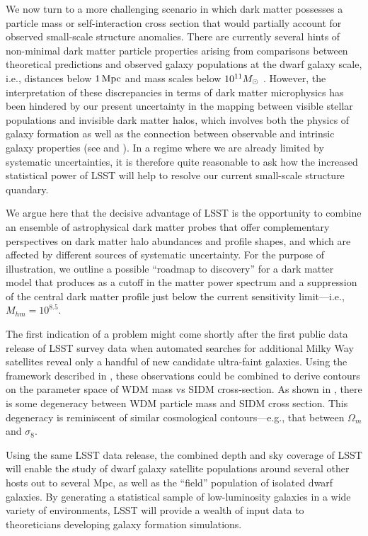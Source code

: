 \documentclass[modern,linenumbers]{aastex62}
\begin{document}
We now turn to a more challenging scenario in which dark matter possesses a particle mass or self-interaction cross section that would partially account for observed small-scale structure anomalies.
There are currently several hints of non-minimal dark matter particle properties arising from comparisons between theoretical predictions and observed galaxy populations at the dwarf galaxy scale, i.e., distances below $1 \mathrm{\,Mpc}$ and mass scales below $10^{11} M_\odot$ \citep[reviewed by][]{BuckleyPeter:2017,Bullock:2017xww}.
However, the interpretation of these discrepancies in terms of dark matter microphysics has been hindered by our present uncertainty in the mapping between visible stellar populations and invisible dark matter halos, which involves both the physics of galaxy formation as well as the connection between observable and intrinsic galaxy properties (see  and ).
In a regime where we are already limited by systematic uncertainties, it is therefore quite reasonable to ask how the increased statistical power of LSST will help to resolve our current small-scale structure quandary.

We argue here that the decisive advantage of LSST is the opportunity to combine an ensemble of astrophysical dark matter probes that offer complementary perspectives on dark matter halo abundances and profile shapes, and which are affected by different sources of systematic uncertainty.
For the purpose of illustration, we outline a possible ``roadmap to discovery'' for a dark matter model that produces as a cutoff in the matter power spectrum and a suppression of the central dark matter profile just below the current sensitivity limit---i.e., $M_{hm} = 10^{8.5}$.

The first indication of a problem might come shortly after the first public data release of LSST survey data when automated searches for additional Milky Way satellites reveal only a handful of new candidate ultra-faint galaxies. 
Using the framework described in , these observations could be combined to derive contours on the parameter space of WDM mass vs SIDM cross-section.
As shown in , there is some degeneracy between WDM particle mass and SIDM cross section.
This degeneracy is reminiscent of similar cosmological contours---e.g., that between $\Omega_m$ and $\sigma_8$.

Using the same LSST data release, the combined depth and sky coverage of LSST will enable the study of dwarf galaxy satellite populations around several other hosts out to several Mpc, as well as the ``field'' population of isolated dwarf galaxies.
By generating a statistical sample of low-luminosity galaxies in a wide variety of environments, LSST will provide a wealth of input data to theoreticians developing galaxy formation simulations.
\end{document}
